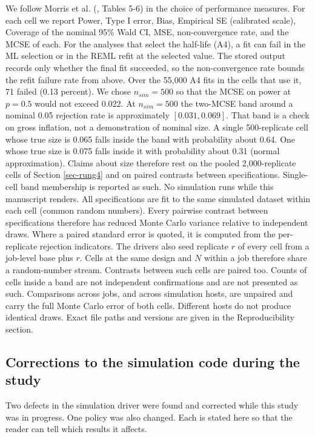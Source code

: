 \documentclass[
  11pt,
]{article}
\begin{document}
We follow Morris et al. (, Tables 5-6) in the
choice of performance measures. For each cell we report Power, Type I
error, Bias, Empirical SE (calibrated scale), Coverage of the nominal
95\% Wald CI, MSE, non-convergence rate, and the MCSE of each. For the
analyses that select the half-life (A4), a fit can fail in the ML
selection or in the REML refit at the selected value. The stored
output records only whether the final fit succeeded, so the
non-convergence rate bounds the refit failure rate from above. Over the
55,000 A4
fits in the cells that use it, 71
failed
(0.13
percent). We chose \(n_{sim} = 500\) so
that the MCSE on power at \(p = 0.5\) would not exceed 0.022. At
\(n_{sim} = 500\) the two-MCSE band around a nominal 0.05 rejection
rate is approximately \([0.031, 0.069]\). That band is a check on
gross inflation, not a demonstration of nominal size. A single
500-replicate cell whose true size is 0.065 falls inside the band
with probability about 0.64. One whose true size is 0.075 falls
inside it with probability about 0.31 (normal approximation). Claims
about size therefore rest on the pooled 2,000-replicate cells of
Section \ref{sec-rung4} and on paired contrasts between
specifications. Single-cell band membership is reported as such. No
simulation runs while this manuscript renders. All specifications are
fit to the same simulated dataset within each cell (common random
numbers). Every pairwise
contrast between specifications therefore has reduced Monte Carlo
variance relative to independent draws. Where a paired standard
error is quoted, it is computed from the per-replicate rejection
indicators. The drivers also seed replicate \(r\) of every cell from a
job-level base plus \(r\). Cells at the same design and \(N\) within a
job therefore share a random-number stream. Contrasts between such
cells are paired too. Counts of cells inside a band are not
independent confirmations and are not presented as such.
Comparisons across jobs, and across simulation hosts, are unpaired
and carry the full Monte Carlo error of both cells. Different hosts
do not produce identical draws. Exact file paths and versions are
given in the Reproducibility section.

\subsection{Corrections to the simulation code during the study}\label{sec-corrections}

Two defects in the simulation driver were found and corrected while
this study was in progress. One policy was also changed. Each is
stated here so that the reader can tell which results it affects.
\end{document}
